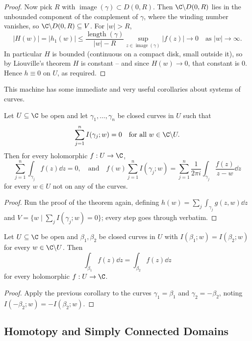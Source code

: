 \begin{proof}
    Now pick $R$ with $\operatorname{image}(\gamma) \subset D(0, R)$. Then $\C \backslash D(0, R)$ lies in the unbounded component of the complement of $\gamma$, where the winding number vanishes, so $\C \backslash D(0, R) \subseteq V$. For $|w| > R$,
    $$
    |H(w)| = |h_1(w)| \leq \frac{\operatorname{length}(\gamma)}{|w| - R}\sup_{z \in \operatorname{image}(\gamma)} |f(z)| \rightarrow 0 \quad \text{as } |w| \rightarrow \infty.
    $$
    In particular $H$ is bounded (continuous on a compact disk, small outside it), so by Liouville's theorem $H$ is constant -- and since $H(w) \rightarrow 0$, that constant is $0$. Hence $h \equiv 0$ on $U$, as required.
\end{proof}

This machine has some immediate and very useful corollaries about systems of curves.

\begin{corollary}
    Let $U \subseteq \C$ be open and let $\gamma_1, \dots, \gamma_n$ be closed curves in $U$ such that
    $$
    \sum_{j = 1}^n I(\gamma_j; w) = 0 \quad \text{for all } w \in \C \backslash U.
    $$
    Then for every holomorphic $f: U \rightarrow \C$,
    $$
    \sum_{j = 1}^n \int_{\gamma_j} f(z) \dd z = 0, \quad \text{and} \quad
    f(w)\sum_{j = 1}^n I(\gamma_j; w) = \sum_{j = 1}^n \frac{1}{2 \pi i}\int_{\gamma_j} \frac{f(z)}{z - w} \dd z
    $$
    for every $w \in U$ not on any of the curves.
\end{corollary}
\begin{proof}
    Run the proof of the theorem again, defining $h(w) = \sum_j \int_{\gamma_j} g(z, w) \dd z$ and $V = \{w \mid \sum_j I(\gamma_j; w) = 0\}$; every step goes through verbatim.
\end{proof}

\begin{corollary}
    Let $U \subseteq \C$ be open and $\beta_1, \beta_2$ be closed curves in $U$ with $I(\beta_1; w) = I(\beta_2; w)$ for every $w \in \C \backslash U$. Then
    $$
    \int_{\beta_1} f(z) \dd z = \int_{\beta_2} f(z) \dd z
    $$
    for every holomorphic $f: U \rightarrow \C$.
\end{corollary}
\begin{proof}
    Apply the previous corollary to the curves $\gamma_1 = \beta_1$ and $\gamma_2 = -\beta_2$, noting $I(-\beta_2; w) = -I(\beta_2; w)$.
\end{proof}

\subsection{Homotopy and Simply Connected Domains}

